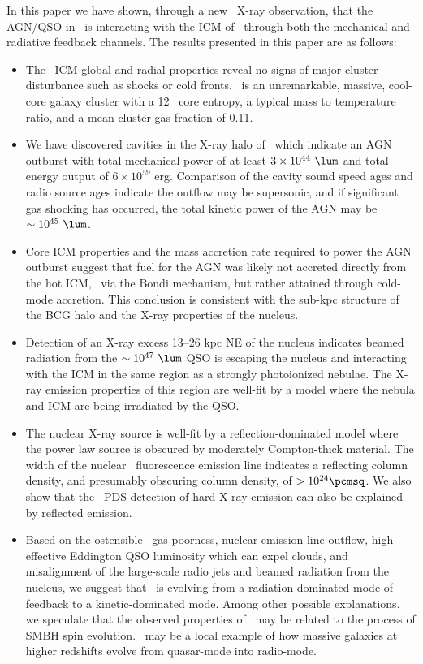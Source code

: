 \documentclass[useAMS,usenatbib]{mn2e}
\begin{document}
In this paper we have shown, through a new \chandra\ X-ray
observation, that the AGN/QSO in \inine\ is interacting with the ICM of
\rxj\ through both the mechanical and radiative feedback channels. The
results presented in this paper are as follows:
\begin{itemize}
\item The \rxj\ ICM global and radial properties reveal no signs of
  major cluster disturbance such as shocks or cold fronts. \rxj\ is an
  unremarkable, massive, cool-core galaxy cluster with a 12 \ent\ core
  entropy, a typical mass to temperature ratio, and a mean cluster gas
  fraction of 0.11.
\item We have discovered cavities in the X-ray halo of \irs\ which
  indicate an AGN outburst with total mechanical power of at least $3
  \times 10^{44} ~\lum$ and total energy output of $6 \times 10^{59}$
  erg. Comparison of the cavity sound speed ages and radio source ages
  indicate the outflow may be supersonic, and if significant gas
  shocking has occurred, the total kinetic power of the AGN may be
  $\sim 10^{45} ~\lum$.
\item Core ICM properties and the mass accretion rate required to
  power the AGN outburst suggest that fuel for the AGN was likely not
  accreted directly from the hot ICM, \ie\ via the Bondi mechanism,
  but rather attained through cold-mode accretion. This conclusion is
  consistent with the sub-kpc structure of the BCG halo and the X-ray
  properties of the nucleus.
\item Detection of an X-ray excess 13--26 kpc NE of the nucleus
  indicates beamed radiation from the $\sim 10^{47} ~\lum$ QSO is
  escaping the nucleus and interacting with the ICM in the same region
  as a strongly photoionized nebulae. The X-ray emission properties of
  this region are well-fit by a model where the nebula and ICM are
  being irradiated by the QSO.
\item The nuclear X-ray source is well-fit by a reflection-dominated
  model where the power law source is obscured by moderately
  Compton-thick material. The width of the nuclear \feka\ fluorescence
  emission line indicates a reflecting column density, and presumably
  obscuring column density, of $> 10^{24} \pcmsq$. We also show that
  the \bepposax\ PDS detection of hard X-ray emission can also be
  explained by reflected emission.
\item Based on the ostensible \irs\ gas-poorness, nuclear emission
  line outflow, high effective Eddington QSO luminosity which can
  expel clouds, and misalignment of the large-scale radio jets and
  beamed radiation from the nucleus, we suggest that \irs\ is evolving
  from a radiation-dominated mode of feedback to a kinetic-dominated
  mode. Among other possible explanations, we speculate that the
  observed properties of \irs\ may be related to the process of SMBH
  spin evolution. \irs\ may be a local example of how massive galaxies
  at higher redshifts evolve from quasar-mode into radio-mode.
\end{itemize}
\end{document}
